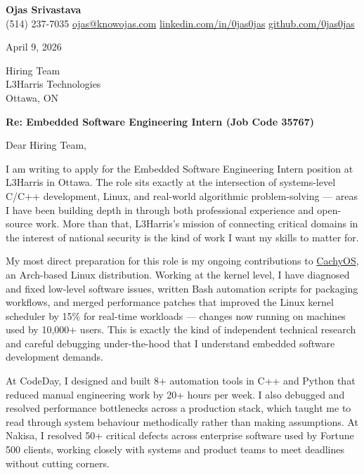 \documentclass[11pt]{article}
\begin{document}
\begin{flushleft}
    {\Large \textbf{Ojas Srivastava}} \\[4pt]
    (514) 237-7035 \quad \href{mailto:ojas@knowojas.com}{ojas@knowojas.com} \quad
    \href{https://linkedin.com/in/0jas0jas}{linkedin.com/in/0jas0jas} \quad
    \href{https://github.com/0jas0jas}{github.com/0jas0jas}
\end{flushleft}

\vspace{6pt}
April 9, 2026

\vspace{12pt}
Hiring Team \\
L3Harris Technologies \\
Ottawa, ON

\vspace{12pt}
\textbf{Re: Embedded Software Engineering Intern (Job Code 35767)}

\vspace{12pt}
Dear Hiring Team,

I am writing to apply for the Embedded Software Engineering Intern position at L3Harris in Ottawa. The role sits exactly at the intersection of systems-level C/C++ development, Linux, and real-world algorithmic problem-solving --- areas I have been building depth in through both professional experience and open-source work. More than that, L3Harris's mission of connecting critical domains in the interest of national security is the kind of work I want my skills to matter for.

My most direct preparation for this role is my ongoing contributions to \href{https://github.com/0jas0jas}{CachyOS}, an Arch-based Linux distribution. Working at the kernel level, I have diagnosed and fixed low-level software issues, written Bash automation scripts for packaging workflows, and merged performance patches that improved the Linux kernel scheduler by 15\% for real-time workloads --- changes now running on machines used by 10,000+ users. This is exactly the kind of independent technical research and careful debugging under-the-hood that I understand embedded software development demands.

At CodeDay, I designed and built 8+ automation tools in C++ and Python that reduced manual engineering work by 20+ hours per week. I also debugged and resolved performance bottlenecks across a production stack, which taught me to read through system behaviour methodically rather than making assumptions. At Nakisa, I resolved 50+ critical defects across enterprise software used by Fortune 500 clients, working closely with systems and product teams to meet deadlines without cutting corners.
\end{document}

